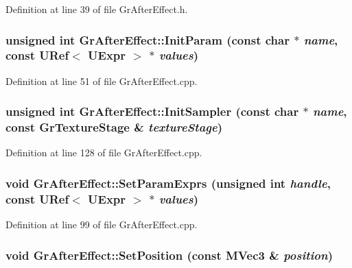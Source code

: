 Definition at line 39 of file GrAfterEffect.h.\hypertarget{class_gr_after_effect_28a716f513169ba2179de9b389e2be8e}{
\subsubsection[{InitParam}]{\setlength{\rightskip}{0pt plus 5cm}unsigned int GrAfterEffect::InitParam (const char $\ast$ {\em name}, \/  const {\bf URef}$<$ {\bf UExpr} $>$ $\ast$ {\em values})}}
\label{class_gr_after_effect_28a716f513169ba2179de9b389e2be8e}




Definition at line 51 of file GrAfterEffect.cpp.\hypertarget{class_gr_after_effect_091017394b0a44d2809aff92ad70aeed}{
\subsubsection[{InitSampler}]{\setlength{\rightskip}{0pt plus 5cm}unsigned int GrAfterEffect::InitSampler (const char $\ast$ {\em name}, \/  const {\bf GrTextureStage} \& {\em textureStage})}}
\label{class_gr_after_effect_091017394b0a44d2809aff92ad70aeed}




Definition at line 128 of file GrAfterEffect.cpp.\hypertarget{class_gr_after_effect_0d1ed187d78661ae8148296906ef22a4}{
\subsubsection[{SetParamExprs}]{\setlength{\rightskip}{0pt plus 5cm}void GrAfterEffect::SetParamExprs (unsigned int {\em handle}, \/  const {\bf URef}$<$ {\bf UExpr} $>$ $\ast$ {\em values})}}
\label{class_gr_after_effect_0d1ed187d78661ae8148296906ef22a4}




Definition at line 99 of file GrAfterEffect.cpp.\hypertarget{class_gr_after_effect_6eef8c6b93d6faa7995b4ff42ea1a3cc}{
\subsubsection[{SetPosition}]{\setlength{\rightskip}{0pt plus 5cm}void GrAfterEffect::SetPosition (const {\bf MVec3} \& {\em position})}}
\label{class_gr_after_effect_6eef8c6b93d6faa7995b4ff42ea1a3cc}





